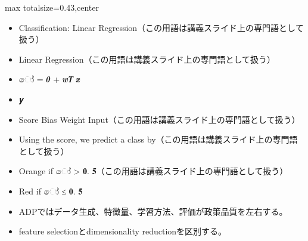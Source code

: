 \clearpage
{}
\begin{minipage}[t]{0.405\textwidth}
\begin{adjustbox}{max totalsize={\textwidth}{0.43\textheight},center}
\begin{minipage}{\textwidth}\scriptsize
{}\begin{itemize}
\item Classification: Linear Regression（この用語は講義スライド上の専門語として扱う）
\item Linear Regression（この用語は講義スライド上の専門語として扱う）
\item ෝ = 𝜽 + 𝒘𝑻 𝒙
\item 𝒚
\item Score Bias Weight Input（この用語は講義スライド上の専門語として扱う）
\item Using the score, we predict a class by（この用語は講義スライド上の専門語として扱う）
\item Orange if ෝ > 𝟎. 𝟓（この用語は講義スライド上の専門語として扱う）
\item Red if ෝ ≤ 𝟎. 𝟓
\end{itemize}\begin{itemize}
\item ADPではデータ生成、特徴量、学習方法、評価が政策品質を左右する。
\item feature selectionとdimensionality reductionを区別する。
\end{itemize}
\end{minipage}
\end{adjustbox}
\end{minipage}\hfill
